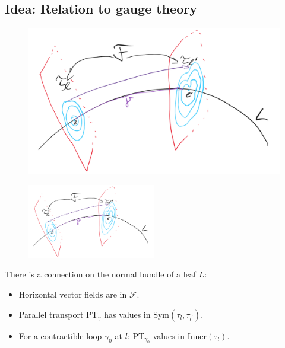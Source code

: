 \documentclass[hyperref={pdfpagelabels=false}]{beamer}
\newcommand\insertreferences{}
\theoremstyle{plain}
\theoremstyle{remark}
\begin{document}
\subsection{Idea: Relation to gauge theory}

\renewcommand\insertreferences{{\tiny Camille Laurent-Gengoux and Leonid Ryvkin, The holonomy of a singular leaf, \newline \textit{Selecta Mathematica 28}, no.\ 2, 45, 2022.}}

\begin{frame}
\begin{figure}[htbp]
	\centering
		\includegraphics[width=1.00\textwidth]{Foliation connection.png}
	\label{fig:Foliation connection}
\end{figure}

\end{frame}

\begin{frame}
\begin{figure}[htbp]
	\centering
		\includegraphics[width=0.50\textwidth]{Foliation connection.png}
	\label{fig:Foliation connection Zwei}
\end{figure}

\begin{theorem}
There is a connection on the normal bundle of a leaf $L$:
\begin{itemize}
	\item Horizontal vector fields are in $\mathcal{F}$.
	\item Parallel transport $\mathup{PT}_\gamma$ has values in $\mathup{Sym}(\tau_l, \tau_{l^\prime})$.
	\item For a contractible loop $\gamma_0$ at $l$: $\mathup{PT}_{\gamma_0}$ values in $\mathup{Inner}(\tau_l)$.
\end{itemize}
\end{theorem}

\end{frame}
\end{document}
